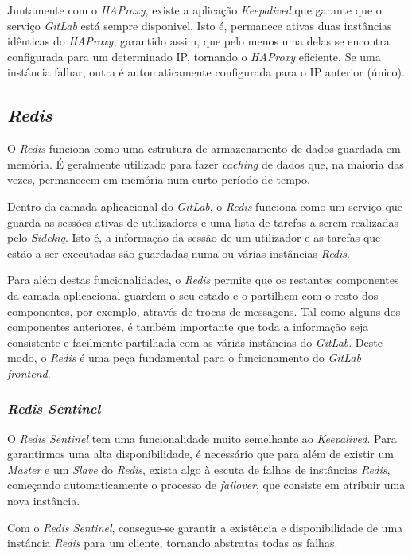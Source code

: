 \documentclass[12pt,a4paper]{article}
\begin{document}
Juntamente com o \emph{HAProxy}, existe a aplicação \emph{Keepalived} que garante que o serviço \emph{GitLab} está sempre disponivel. Isto é, permanece ativas duas instâncias idênticas do \emph{HAProxy}, garantido assim, que pelo menos uma delas se encontra configurada para um determinado IP, tornando o \emph{HAProxy} eficiente. Se uma instância falhar, outra é automaticamente configurada para o IP anterior (único).



\subsection{\emph{Redis}}

O \emph{Redis} funciona como uma estrutura de armazenamento de dados guardada em memória. É geralmente utilizado para fazer \emph{caching} de dados que, na maioria das vezes, permanecem em memória num curto período de tempo.

Dentro da camada aplicacional do \emph{GitLab}, o \emph{Redis} funciona como um serviço que guarda as sessões ativas de utilizadores e uma lista de tarefas a serem realizadas pelo \emph{Sidekiq}. Isto é, a informação da sessão de um utilizador e as tarefas que estão a ser executadas são guardadas numa ou várias instâncias \emph{Redis}.

Para além destas funcionalidades, o \emph{Redis} permite que os restantes componentes da camada aplicacional guardem o seu estado e o partilhem com o resto dos componentes, por exemplo, através de trocas de messagens. Tal como alguns dos componentes anteriores, é também importante que toda a informação seja consistente e facilmente partilhada com as várias instâncias do \emph{GitLab}. Deste modo, o \emph{Redis} é uma peça fundamental para o funcionamento do \emph{GitLab frontend}.

\subsubsection{\emph{Redis Sentinel}}

O \emph{Redis Sentinel} tem uma funcionalidade muito semelhante ao \emph{Keepalived}. Para garantirmos uma alta disponibilidade, é necessário que para além de existir um \emph{Master} e um \emph{Slave} do \emph{Redis}, exista algo à escuta de falhas de instâncias \emph{Redis}, começando automaticamente o processo de \emph{failover}, que consiste em atribuir uma nova instância.

Com o \emph{Redis Sentinel}, consegue-se garantir a existência e disponibilidade de uma instância \emph{Redis} para um cliente, tornando abstratas todas as falhas.
\end{document}
